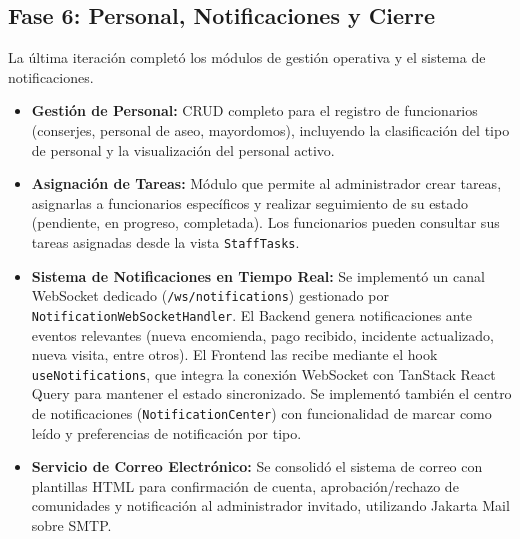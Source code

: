 \subsection{Fase 6: Personal, Notificaciones y Cierre}
La última iteración completó los módulos de gestión operativa y el sistema de notificaciones.
\begin{itemize}
    \item \textbf{Gestión de Personal:} CRUD completo para el registro de funcionarios (conserjes, personal de aseo, mayordomos), incluyendo la clasificación del tipo de personal y la visualización del personal activo.
    \item \textbf{Asignación de Tareas:} Módulo que permite al administrador crear tareas, asignarlas a funcionarios específicos y realizar seguimiento de su estado (pendiente, en progreso, completada). Los funcionarios pueden consultar sus tareas asignadas desde la vista \texttt{StaffTasks}.
    \item \textbf{Sistema de Notificaciones en Tiempo Real:} Se implementó un canal WebSocket dedicado (\texttt{/ws/notifications}) gestionado por \texttt{NotificationWebSocketHandler}. El Backend genera notificaciones ante eventos relevantes (nueva encomienda, pago recibido, incidente actualizado, nueva visita, entre otros). El Frontend las recibe mediante el hook \texttt{useNotifications}, que integra la conexión WebSocket con TanStack React Query para mantener el estado sincronizado. Se implementó también el centro de notificaciones (\texttt{NotificationCenter}) con funcionalidad de marcar como leído y preferencias de notificación por tipo.
    \item \textbf{Servicio de Correo Electrónico:} Se consolidó el sistema de correo con plantillas HTML para confirmación de cuenta, aprobación/rechazo de comunidades y notificación al administrador invitado, utilizando Jakarta Mail sobre SMTP.
\end{itemize}


